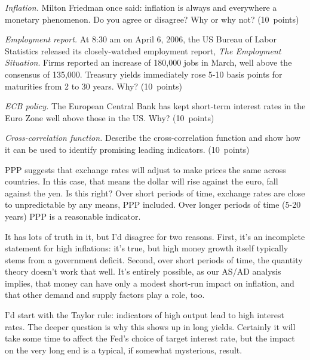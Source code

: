 \documentclass[letterpaper,12pt]{exam}
\begin{document}
\begin{questions}
\begin{parts}
\item {\it Inflation.\/}
Milton Friedman once said:  inflation is always and everywhere a monetary phenomenon.
Do you agree or disagree?  Why or why not?  (10~points)

\item {\it Employment report.\/}
At 8:30 am on April 6, 2006,
the US Bureau of Labor Statistics released
its closely-watched employment report, {\it The Employment Situation\/}.
Firms reported an increase of 180,000 jobs in March,
well above the consensus of 135,000.
Treasury yields immediately rose 5-10 basis points
for maturities from 2 to 30 years.
Why?
(10~points)

\item {\it ECB policy.\/}
The European Central Bank has kept short-term interest rates
in the Euro Zone well above those in the US.
Why?  (10~points)

\item {\it Cross-correlation function.\/}
Describe the cross-correlation function and show how it can
be used to identify promising leading indicators.
(10~points)
\end{parts}

\begin{solution}
\begin{parts}

\item   PPP suggests that exchange rates will adjust to make prices the same across countries. In
this case, that means the dollar will rise against the euro, fall against the yen.  Is this right?
Over short periods of time, exchange rates are close to unpredictable by any means, PPP included.
Over longer periods of time (5-20 years) PPP is a reasonable indicator.

\item It has lots of truth in it, but I'd disagree for two reasons.
First, it's an incomplete statement for high inflations:
it's true, but high money growth itself typically stems from
a government deficit.
Second, over short periods of time, the quantity theory doesn't work
that well.
It's entirely possible, as our AS/AD analysis implies, that
money can have only a modest short-run impact on inflation,
and that other demand and supply factors play a role, too.

\item  I'd start with the Taylor rule:  indicators of high output
lead to high interest rates.
The deeper question is why this shows up in long yields.
Certainly it will take some time to affect the Fed's choice of
target interest rate, but the impact on the very long end is a
typical, if somewhat mysterious, result.


\end{parts}
\end{solution}
\end{questions}
\end{document}

